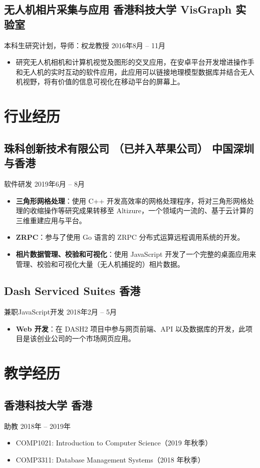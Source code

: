\documentclass[
  10pt,           %
  autoindent=0pt, %
  scheme=plain,   %
]{ctexart}
\newcommand{\subsec}[2]{\subsection*{#1 \hfill {\normalfont #2}}}
\newcommand{\subsecdesc}[2]{{\kaishu #1 \hfill #2}}
\begin{document}
  \subsec{无人机相片采集与应用}{香港科技大学 VisGraph 实验室}
  \subsecdesc{本科生研究计划，导师：权龙教授}{2016年8月 -- 11月}
  \begin{itemize}
    \item 研究无人机相机和计算机视觉及图形的交叉应用，在安卓平台开发增进操作手和无人机的实时互动的软件应用，此应用可以链接地理模型数据库并结合无人机视野，将有价值的信息可视化在移动平台的屏幕上。
  \end{itemize}

\section*{行业经历} %

  \subsec{珠科创新技术有限公司 {\small （已并入苹果公司）}}{中国深圳与香港}
  \subsecdesc{软件研发}{2019年6月 -- 8月}
  \begin{itemize}
    \item \textbf{三角形网格处理}：使用 C++ 开发高效率的网格处理程序，将对三角形网格处理的收缩操作等研究成果转移至 Altizure，一个领域内一流的、基于云计算的三维重建应用与平台。
    \item \textbf{ZRPC}：参与了使用 Go 语言的 ZRPC 分布式运算远程调用系统的开发。
    \item \textbf{相片数据管理、校验和可视化}：使用 JavaScript 开发了一个完整的桌面应用来管理、校验和可视化大量（无人机捕捉的）相片数据。
  \end{itemize}
          
  \subsec{Dash Serviced Suites}{香港}
  \subsecdesc{兼职JavaScript开发}{2018年2月 -- 5月}
  \begin{itemize}
    \item \textbf{Web 开发}：在 DASH2 项目中参与网页前端、API 以及数据库的开发，此项目是该创业公司的一个市场网页应用。
  \end{itemize}

\section*{教学经历} %

  \subsec{香港科技大学}{香港}
  \subsecdesc{助教}{2018年 -- 2019年}
  \begin{itemize}
    \item COMP1021: Introduction to Computer Science（2019 年秋季）
    \item COMP3311: Database Management Systems（2018 年秋季）
  \end{itemize}
\end{document}
